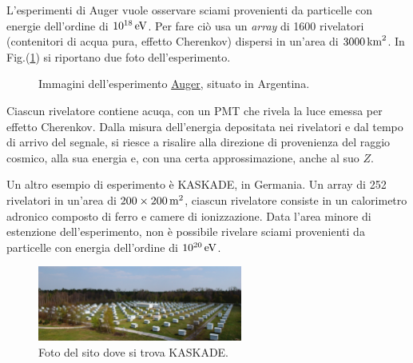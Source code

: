 L'esperimenti di Auger vuole osservare sciami provenienti da particelle con energie dell'ordine di $10^{18}\,\textup{eV}$. Per fare ciò usa un \emph{array} di 1600 rivelatori (contenitori di acqua pura, effetto Cherenkov) dispersi in un'area di $3000\,\textup{km}^2$. In Fig.(\ref{img:auger}) si riportano due foto dell'esperimento.
\begin{figure}[H]
    \centering
    \qquad
    \caption{Immagini dell'esperimento \href{https://www.auger.org}{Auger}, situato in Argentina.}%
    \label{img:auger}
\end{figure}
Ciascun rivelatore contiene acuqa, con un PMT che rivela la luce emessa per effetto Cherenkov. Dalla misura dell'energia depositata nei rivelatori e dal tempo di arrivo del segnale, si riesce a risalire alla direzione di provenienza del raggio cosmico, alla sua energia e, con una certa approssimazione, anche al suo $Z$.

Un altro esempio di esperimento è KASKADE, in Germania. Un array di 252 rivelatori in un'area di $200\times 200\,\textup{m}^2$, ciascun rivelatore consiste in un calorimetro adronico composto di ferro e camere di ionizzazione. Data l'area minore di estenzione dell'esperimento, non è possibile rivelare sciami provenienti da particelle con energia dell'ordine di $10^{20}\,\textup{eV}$.

\begin{figure}[H]
    \centering
    \includegraphics[width=0.6\textwidth]{img/kaskade.jpg}
    \caption{Foto del sito dove si trova KASKADE.}
    \label{img:kaskade}    
\end{figure}

